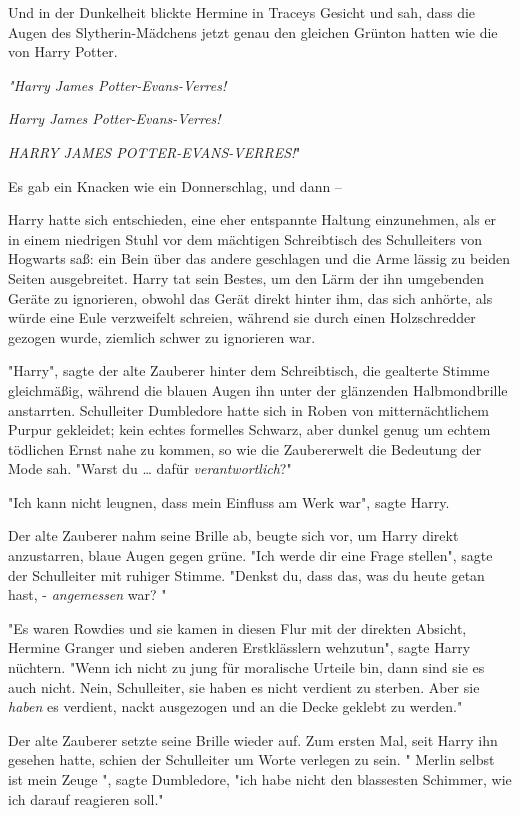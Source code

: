 {Und in der Dunkelheit blickte Hermine in Traceys Gesicht und sah, dass die Augen des Slytherin-Mädchens jetzt genau den gleichen Grünton hatten wie die von Harry Potter.

\emph{"\emph{Harry James Potter-Evans-Verres!}}

\emph{\emph{Harry James Potter-Evans-Verres!}}

\emph{HARRY JAMES POTTER-EVANS-VERRES!}"

Es gab ein Knacken wie ein Donnerschlag, und dann --

Harry hatte sich entschieden, eine eher entspannte Haltung einzunehmen, als er in einem niedrigen Stuhl vor dem mächtigen Schreibtisch des Schulleiters von Hogwarts saß: ein Bein über das andere geschlagen und die Arme lässig zu beiden Seiten ausgebreitet. Harry tat sein Bestes, um den Lärm der ihn umgebenden Geräte zu ignorieren, obwohl das Gerät direkt hinter ihm, das sich anhörte, als würde eine Eule verzweifelt schreien, während sie durch einen Holzschredder gezogen wurde, ziemlich schwer zu ignorieren war.

"Harry", sagte der alte Zauberer hinter dem Schreibtisch, die gealterte Stimme gleichmäßig, während die blauen Augen ihn unter der glänzenden Halbmondbrille anstarrten. Schulleiter Dumbledore hatte sich in Roben von mitternächtlichem Purpur gekleidet; kein echtes formelles Schwarz, aber dunkel genug um echtem tödlichen Ernst nahe zu kommen, so wie die Zaubererwelt die Bedeutung der Mode sah. "Warst du … dafür \emph{verantwortlich}?"

"Ich kann nicht leugnen, dass mein Einfluss am Werk war", sagte Harry.

Der alte Zauberer nahm seine Brille ab, beugte sich vor, um Harry direkt anzustarren, blaue Augen gegen grüne. "Ich werde dir eine Frage stellen", sagte der Schulleiter mit ruhiger Stimme. "Denkst du, dass das, was du heute getan hast, - \emph{angemessen} war? "

"Es waren Rowdies und sie kamen in diesen Flur mit der direkten Absicht, Hermine Granger und sieben anderen Erstklässlern wehzutun", sagte Harry nüchtern. "Wenn ich nicht zu jung für moralische Urteile bin, dann sind sie es auch nicht. Nein, Schulleiter, sie haben es nicht verdient zu sterben. Aber sie \emph{haben} es verdient, nackt ausgezogen und an die Decke geklebt zu werden."

Der alte Zauberer setzte seine Brille wieder auf. Zum ersten Mal, seit Harry ihn gesehen hatte, schien der Schulleiter um Worte verlegen zu sein. " Merlin selbst ist mein Zeuge ", sagte Dumbledore, "ich habe nicht den blassesten Schimmer, wie ich darauf reagieren soll."

}
